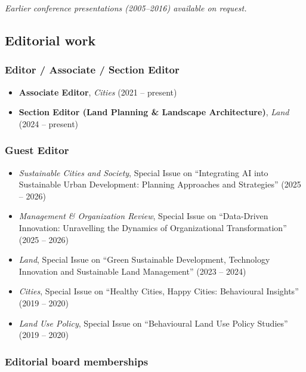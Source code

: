 \documentclass[11pt,a4paper]{article}
\providecommand{\tightlist}{%
  \setlength{\itemsep}{1pt}\setlength{\parskip}{0pt}}
\begin{document}
\emph{Earlier conference presentations (2005--2016) available on
request.}

\subsection{Editorial work}\label{editorial-work}

\subsubsection{Editor / Associate / Section
Editor}\label{editor-associate-section-editor}

\begin{itemize}
\tightlist
\item
  \textbf{Associate Editor}, \emph{Cities} (2021 -- present)
\item
  \textbf{Section Editor (Land Planning \& Landscape Architecture)},
  \emph{Land} (2024 -- present)
\end{itemize}

\subsubsection{Guest Editor}\label{guest-editor}

\begin{itemize}
\tightlist
\item
  \emph{Sustainable Cities and Society}, Special Issue on ``Integrating
  AI into Sustainable Urban Development: Planning Approaches and
  Strategies'' (2025 -- 2026)
\item
  \emph{Management \& Organization Review}, Special Issue on
  ``Data-Driven Innovation: Unravelling the Dynamics of Organizational
  Transformation'' (2025 -- 2026)
\item
  \emph{Land}, Special Issue on ``Green Sustainable Development,
  Technology Innovation and Sustainable Land Management'' (2023 -- 2024)
\item
  \emph{Cities}, Special Issue on ``Healthy Cities, Happy Cities:
  Behavioural Insights'' (2019 -- 2020)
\item
  \emph{Land Use Policy}, Special Issue on ``Behavioural Land Use Policy
  Studies'' (2019 -- 2020)
\end{itemize}

\subsubsection{Editorial board
memberships}\label{editorial-board-memberships}
\end{document}
